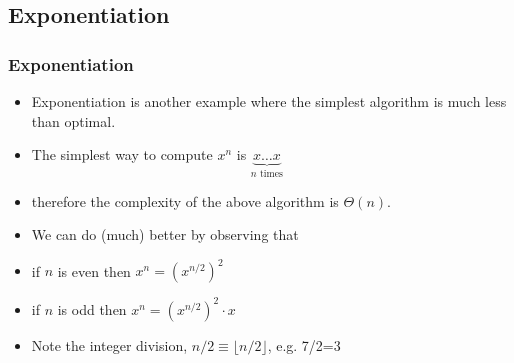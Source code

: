 \documentclass{beamer}
\newcommand{\floor}[1]{\lfloor{#1}\rfloor}
\begin{document}

\subsection{Exponentiation}


\begin{frame}
  \frametitle{Exponentiation}
  \begin{itemize}
  \item Exponentiation is another example where the simplest algorithm
    is much less than optimal.
  \item The simplest way to compute $x^n$ is
    $\underbrace{x\ldots x}_{n\text{ times}}$
\item therefore the complexity of the above algorithm is $\Theta(n)$.
\item We can do (much) better by observing that
\item if $n$ is even then $x^n=(x^{n/2})^2$
\item if $n$ is odd then $x^n=(x^{n/2})^2\cdot x$
\item Note the integer division, $n/2\equiv \lfloor n/2\rfloor$, e.g. 7/2=3
  \end{itemize}
\end{frame}
\end{document}
